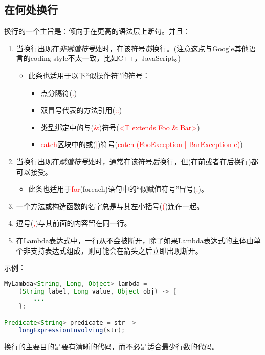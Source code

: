 \documentclass[cn,11pt,chinese]{elegantbook}
\begin{document}
\subsection{在何处换行}
换行的一个主旨是：倾向于在更高的语法层上断句。并且：
\begin{enumerate}
	\item 当换行出现在\emph{非赋值符号}处时，在该符号\emph{前}换行。(注意这点与Google其他语言的coding style不太一致，比如C++，JavaScript。)
	\begin{itemize}
		\item 此条也适用于以下``似操作符''的符号：
		\begin{itemize}
			\item 点分隔符(\textcolor{red}{.})
			\item 双冒号代表的方法引用(\textcolor{red}{::})
			\item 类型绑定中的与(\textcolor{red}{\&})符号(\textcolor{red}{<T extends Foo \& Bar>})
			\item \textcolor{red}{catch}区块中的或(\textcolor{red}{|})符号(\textcolor{red}{catch (FooException | BarException e)})
		\end{itemize}
	\end{itemize}
	\item 当换行出现在\emph{赋值符号}处时，通常在该符号\emph{后}换行，但(在前或者在后换行)都可以接受。
	\begin{itemize}
		\item 此条也适用于\textcolor{red}{for}(foreach)语句中的``似赋值符号''冒号(\textcolor{red}{:})。  
	\end{itemize}
	\item 一个方法或构造函数的名字总是与其左小括号(\textcolor{red}{(})连在一起。
	\item 逗号(\textcolor{red}{,})与其前面的内容留在同一行。
	\item 在Lambda表达式中，一行从不会被断开，除了如果Lambda表达式的主体由单个非支持表达式组成，则可能会在箭头之后立即出现断开。
\end{enumerate}

示例：
\begin{lstlisting}[language=java]
MyLambda<String, Long, Object> lambda =
	(String label, Long value, Object obj) -> {
		...
	};

Predicate<String> predicate = str ->
	longExpressionInvolving(str);
\end{lstlisting}

\begin{note}
	换行的主要目的是要有清晰的代码，而不必是适合最少行数的代码。
\end{note}
\end{document}
